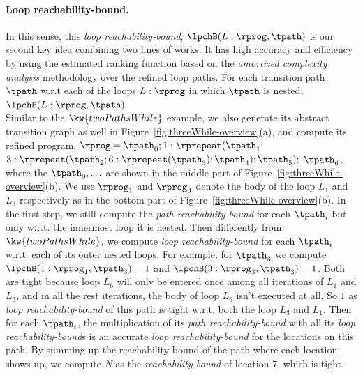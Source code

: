 \paragraph*{Loop reachability-bound.}
In this sense, this \emph{loop reachability-bound}, $\lpchB(L:\rprog, \tpath)$ is our second key idea combining two lines of works.
It has high accuracy and efficiency by using the estimated ranking function based on the \emph{amortized complexity analysis} methodology over the refined loop paths.
For each transition path $\tpath$ w.r.t each of the loops $L:\rprog$ in which $\tpath$ is nested,
$\lpchB(L:\rprog, \tpath)$ 
\\
Similar to the $\kw{twoPathsWhile}$ example, we also generate its abstract transition graph as well in Figure~\ref{fig:threeWhile-overview}(a),
and compute its refined program,
$\rprog = \tpath_0; 1: \rprepeat(\tpath_1;$ 
$3: {\rprepeat(\tpath_2; 6 : {\rprepeat(\tpath_3)}; \tpath_4)}; \tpath_5);$ 
$\tpath_6$,
where the $\tpath_0, \ldots$ are shown in the middle part of Figure~\ref{fig:threeWhile-overview}(b).
We use $\rprog_1$ and $\rprog_3$ denote the body of the loop $L_1$ and $L_3$ respectively as in the bottom part of Figure~\ref{fig:threeWhile-overview}(b).
In the first step, we still compute the \emph{path reachability-bound} for each $\tpath_i$ but only w.r.t. the innermost loop it is nested.
Then differently from $\kw{twoPathsWhile}$,
we compute \emph{loop reachability-bound} for each $\tpath_i$ w.r.t. each of its outer nested loops.
For example, for $\tpath_3$ we compute
$\lpchB(1: \rprog_1, \tpath_3) = 1$ and
$\lpchB(3: \rprog_3, \tpath_3) = 1$.
Both are tight because loop $L_6$ will only be entered once among all iterations of $L_1$ and $L_3$, and in all the rest iterations, the body of loop $L_6$ isn't executed at all.
So $1$ as \emph{loop reachability-bound} of this path is tight w.r.t. both the loop $L_3$ and $L_1$.
Then for each $\tpath_i$, the multiplication of its \emph{path reachability-bound} with all its \emph{loop reachability-bound}s is an accurate \emph{loop reachability-bound} for the locations on this path.
By summing up the reachability-bound of the path where each location shows up,
we compute $N$ as the \emph{reachability-bound} of location $7$, which is tight.


